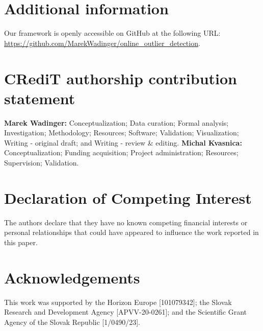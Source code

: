 \documentclass[preprint,12pt,authoryear]{elsarticle}
\begin{document}
\section*{Additional information}
Our framework is openly accessible on GitHub at the following URL: \url{https://github.com/MarekWadinger/online_outlier_detection}.

\section*{CRediT authorship contribution statement}
\textbf{Marek Wadinger:} Conceptualization; Data curation; Formal analysis; Investigation; Methodology; Resources; Software; Validation; Visualization; Writing - original draft; and Writing - review \& editing. \textbf{Michal Kvasnica:} Conceptualization; Funding acquisition; Project administration; Resources; Supervision; Validation.

\section*{Declaration of Competing Interest}
The authors declare that they have no known competing financial interests or personal relationships that could have appeared to influence the work reported in this paper.

\section*{Acknowledgements}
This work was supported by the Horizon Europe [101079342]; the Slovak Research and Development Agency [APVV-20-0261]; and the Scientific Grant Agency of the Slovak Republic [1/0490/23].








\end{document}
